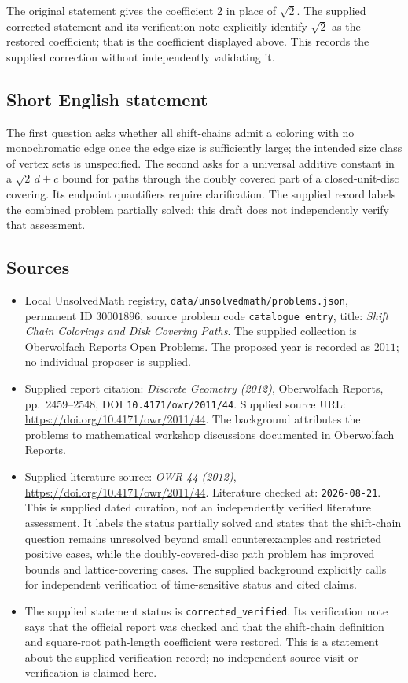 \documentclass[11pt]{article}
\begin{document}
The original statement gives the coefficient \(2\) in place of \(\sqrt{2}\). The supplied corrected statement and its verification note explicitly identify \(\sqrt{2}\) as the restored coefficient; that is the coefficient displayed above. This records the supplied correction without independently validating it.
\subsection{Short English statement}
The first question asks whether all shift-chains admit a coloring with no monochromatic edge once the edge size is sufficiently large; the intended size class of vertex sets is unspecified. The second asks for a universal additive constant in a \(\sqrt{2}\,d+c\) bound for paths through the doubly covered part of a closed-unit-disc covering. Its endpoint quantifiers require clarification. The supplied record labels the combined problem partially solved; this draft does not independently verify that assessment.
\subsection{Sources}
\begin{itemize}
\item Local UnsolvedMath registry, \texttt{data/unsolvedmath/problems.json}, permanent ID \(30001896\), source problem code \texttt{catalogue entry}, title: \emph{Shift Chain Colorings and Disk Covering Paths}. The supplied collection is Oberwolfach Reports Open Problems. The proposed year is recorded as \(2011\); no individual proposer is supplied.
\item Supplied report citation: \emph{Discrete Geometry (2012)}, Oberwolfach Reports, pp.\ 2459--2548, DOI \texttt{10.4171/owr/2011/44}. Supplied source URL: \url{https://doi.org/10.4171/owr/2011/44}. The background attributes the problems to mathematical workshop discussions documented in Oberwolfach Reports.
\item Supplied literature source: \emph{OWR 44 (2012)}, \url{https://doi.org/10.4171/owr/2011/44}. Literature checked at: \texttt{2026-08-21}. This is supplied dated curation, not an independently verified literature assessment. It labels the status partially solved and states that the shift-chain question remains unresolved beyond small counterexamples and restricted positive cases, while the doubly-covered-disc path problem has improved bounds and lattice-covering cases. The supplied background explicitly calls for independent verification of time-sensitive status and cited claims.
\item The supplied statement status is \texttt{corrected\_verified}. Its verification note says that the official report was checked and that the shift-chain definition and square-root path-length coefficient were restored. This is a statement about the supplied verification record; no independent source visit or verification is claimed here.
\end{itemize}
\end{document}
